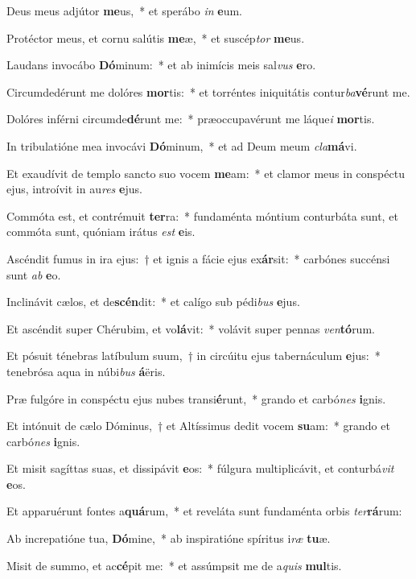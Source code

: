 \item Deus meus adjútor \textbf{me}us,~* et sperábo \textit{in} \textbf{e}um.
\item Protéctor meus, et cornu salútis \textbf{me}æ,~* et suscép\textit{tor} \textbf{me}us.
\item Laudans invocábo \textbf{Dó}minum:~* et ab inimícis meis sal\textit{vus} \textbf{e}ro.
\item Circumdedérunt me dolóres \textbf{mor}tis:~* et torréntes iniquitátis contur\textit{ba}\textbf{vé}runt me.
\item Dolóres inférni circumde\textbf{dé}runt me:~* præoccupavérunt me láque\textit{i} \textbf{mor}tis.
\item In tribulatióne mea invocávi \textbf{Dó}minum,~* et ad Deum meum \textit{cla}\textbf{má}vi.
\item Et exaudívit de templo sancto suo vocem \textbf{me}am:~* et clamor meus in conspéctu ejus, introívit in au\textit{res} \textbf{e}jus.
\item Commóta est, et contrémuit \textbf{ter}ra:~* fundaménta móntium conturbáta sunt, et commóta sunt, quóniam irátus \textit{est} \textbf{e}is.
\item Ascéndit fumus in ira ejus:~† et ignis a fácie ejus ex\textbf{ár}sit:~* carbónes succénsi sunt \textit{ab} \textbf{e}o.
\item Inclinávit cælos, et de\textbf{scén}dit:~* et calígo sub pédi\textit{bus} \textbf{e}jus.
\item Et ascéndit super Chérubim, et vo\textbf{lá}vit:~* volávit super pennas \textit{ven}\textbf{tó}rum.
\item Et pósuit ténebras latíbulum suum,~† in circúitu ejus tabernáculum \textbf{e}jus:~* tenebrósa aqua in núbi\textit{bus} \textbf{á}ëris.
\item Præ fulgóre in conspéctu ejus nubes transi\textbf{é}runt,~* grando et carbó\textit{nes} \textbf{i}gnis.
\item Et intónuit de cælo Dóminus,~† et Altíssimus dedit vocem \textbf{su}am:~* grando et carbó\textit{nes} \textbf{i}gnis.
\item Et misit sagíttas suas, et dissipávit \textbf{e}os:~* fúlgura multiplicávit, et conturbá\textit{vit} \textbf{e}os.
\item Et apparuérunt fontes a\textbf{quá}rum,~* et reveláta sunt fundaménta orbis \textit{ter}\textbf{rá}rum:
\item Ab increpatióne tua, \textbf{Dó}mine,~* ab inspiratióne spíritus i\textit{ræ} \textbf{tu}æ.
\item Misit de summo, et ac\textbf{cé}pit me:~* et assúmpsit me de a\textit{quis} \textbf{mul}tis.
